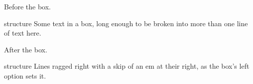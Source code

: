 \documentclass{beamer}
\begin{document}
\begin{frame}
Before the box.

\begin{beamercolorbox}[wd=5cm,sep=4pt]{structure}
Some text in a box, long enough to be broken into more than one line of text here.
\end{beamercolorbox}

After the box.

\begin{beamercolorbox}[wd=4cm,left=1em]{structure}
Lines ragged right with a skip of an em at their right, as the box's left option sets it.
\end{beamercolorbox}
\end{frame}
\end{document}

